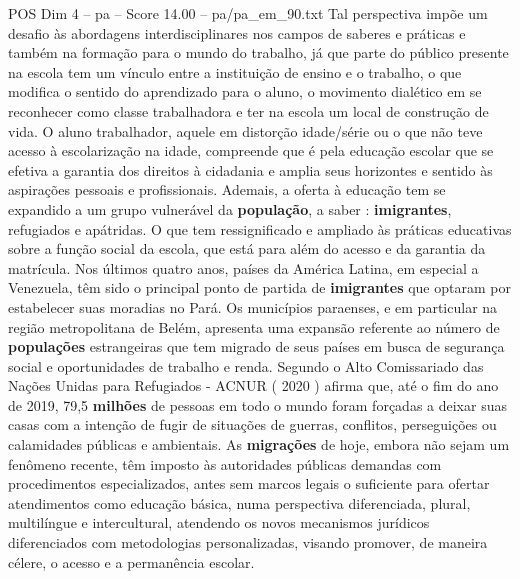\begin{textsample}{POS Dim 4 – pa – Score 14.00 – pa/pa\_em\_90.txt}
Tal perspectiva impõe um desafio às abordagens interdisciplinares nos campos de saberes e práticas e também na formação para o mundo do trabalho, já que parte do público presente na escola tem um vínculo entre a instituição de ensino e o trabalho, o que modifica o sentido do aprendizado para o aluno, o movimento dialético em se reconhecer como classe trabalhadora e ter na escola um local de construção de vida.
O aluno trabalhador, aquele em distorção idade/série ou o que não teve acesso à escolarização na idade, compreende que é pela educação escolar que se efetiva a garantia dos direitos à cidadania e amplia seus horizontes e sentido às aspirações pessoais e profissionais.
Ademais, a oferta à educação tem se expandido a um grupo vulnerável da \textbf{população}, a saber : \textbf{imigrantes}, refugiados e apátridas.
O que tem ressignificado e ampliado às práticas educativas sobre a função social da escola, que está para além do acesso e da garantia da matrícula.
Nos últimos quatro anos, países da América Latina, em especial a Venezuela, têm sido o principal ponto de partida de \textbf{imigrantes} que optaram por estabelecer suas moradias no Pará.
Os municípios paraenses, e em particular na região metropolitana de Belém, apresenta uma expansão referente ao número de \textbf{populações} estrangeiras que tem migrado de seus países em busca de segurança social e oportunidades de trabalho e renda.
Segundo o Alto Comissariado das Nações Unidas para Refugiados - ACNUR ( 2020 ) afirma que, até o fim do ano de 2019, 79,5 \textbf{milhões} de pessoas em todo o mundo foram forçadas a deixar suas casas com a intenção de fugir de situações de guerras, conflitos, perseguições ou calamidades públicas e ambientais.
As \textbf{migrações} de hoje, embora não sejam um fenômeno recente, têm imposto às autoridades públicas demandas com procedimentos especializados, antes sem marcos legais o suficiente para ofertar atendimentos como educação básica, numa perspectiva diferenciada, plural, multilíngue e intercultural, atendendo os novos mecanismos jurídicos diferenciados com metodologias personalizadas, visando promover, de maneira célere, o acesso e a permanência escolar.

\end{textsample}
